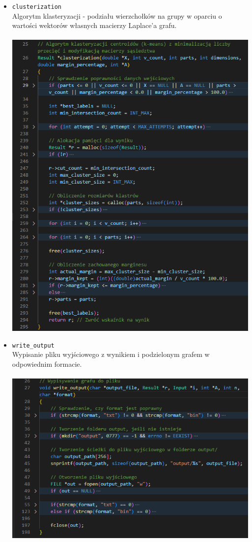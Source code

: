 \documentclass{article}
\begin{document}
\begin{itemize}
        \item \texttt{clusterization} \\
        Algorytm klasteryzacji - podziału wierzchołków na grupy w oparciu o wartości wektorów własnych macierzy Laplace'a grafu. \\\\
        \includegraphics[width=0.8\linewidth, center]{img/clusterization.png}
        
        \item \texttt{write\_output} \\
        Wypisanie pliku wyjściowego z wynikiem i podzielonym grafem w odpowiednim formacie. \\\\
        \includegraphics[width=0.8\linewidth, center]{img/write_output.png}
        
    \end{itemize}
    
\end{document}
